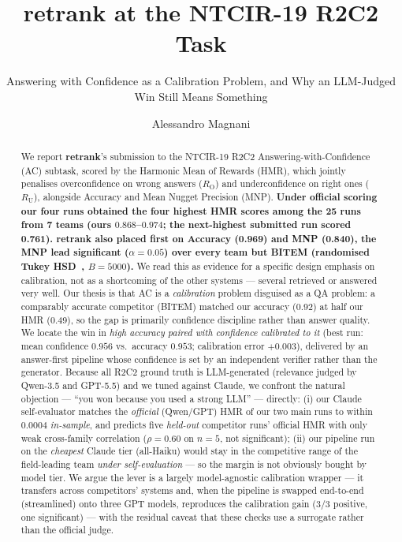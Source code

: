 \documentclass[sigconf,nonacm]{acmart}
\newcommand{\HMR}{\textsc{HMR}}
\newcommand{\MNP}{\textsc{MNP}}
\newcommand{\RO}{R_{\mathrm{O}}}
\newcommand{\RU}{R_{\mathrm{U}}}
\begin{document}
\title{retrank at the NTCIR-19 R2C2 Task}
\subtitle{Answering with Confidence as a Calibration Problem, and Why an LLM-Judged Win Still Means Something}

\author{Alessandro Magnani}

\renewcommand{\shortauthors}{Magnani}

\begin{abstract}
We report \textbf{retrank}'s submission to the NTCIR-19 R2C2 Answering-with-Confidence
(AC) subtask, scored by the Harmonic Mean of Rewards (\HMR), which jointly penalises
overconfidence on wrong answers ($\RO$) and underconfidence on right ones ($\RU$),
alongside Accuracy and Mean Nugget Precision (\MNP). \textbf{Under official scoring our
four runs obtained the four highest \HMR{} scores among the 25 runs from 7 teams (ours
$0.868$--$0.974$; the next-highest submitted run scored 0.761). retrank also placed first
on Accuracy (0.969) and \MNP{} (0.840), the \MNP{} lead significant ($\alpha{=}0.05$)
over every team but BITEM (randomised Tukey HSD~\cite{sakai-sigtest}, $B{=}5000$).} We read
this as evidence for a specific design emphasis on calibration, not as a shortcoming of the
other systems --- several retrieved or answered very well. Our thesis is that AC is a \emph{calibration}
problem disguised as a QA problem: a comparably accurate competitor (BITEM) matched our
accuracy (0.92) at half our \HMR{} (0.49), so the gap is primarily confidence discipline
rather than answer quality. We locate the win in \emph{high accuracy paired with confidence
calibrated to it} (best run: mean confidence $0.956$ vs.\ accuracy $0.953$; calibration
error $+0.003$), delivered by an
answer-first pipeline whose confidence is set by an independent verifier rather than the
generator. Because all R2C2 ground truth is LLM-generated (relevance judged by Qwen-3.5
and GPT-5.5) and we tuned against Claude, we confront the natural objection --- ``you won
because you used a strong LLM'' --- directly: (i) our Claude self-evaluator matches the
\emph{official} (Qwen/GPT) \HMR{} of our two main runs to within $0.0004$ \emph{in-sample},
and predicts five \emph{held-out} competitor runs' official \HMR{} with only weak
cross-family correlation ($\rho{=}0.60$ on $n{=}5$, not significant); (ii) our pipeline
run on the \emph{cheapest} Claude tier (all-Haiku) would stay in the competitive range of
the field-leading team \emph{under self-evaluation} --- so the margin is not obviously bought
by model tier.
We argue the lever is a
largely model-agnostic calibration wrapper --- it transfers across competitors' systems and,
when the pipeline is swapped end-to-end (streamlined) onto three GPT models, reproduces the
calibration gain (3/3 positive, one significant) --- with the residual caveat that these checks use a
surrogate rather than the official judge.
\end{abstract}
\end{document}
